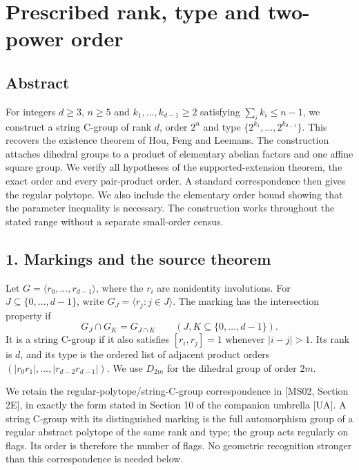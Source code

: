 \documentclass[
  11pt,
  a4paper,
]{article}
\author{}
\date{}
\begin{document}
\section{Prescribed rank, type and two-power
order}\label{prescribed-rank-type-and-two-power-order}

\subsection{Abstract}\label{abstract}

For integers \(d\ge3\), \(n\ge5\) and \(k_1,\ldots,k_{d-1}\ge2\)
satisfying \(\sum_i k_i\le n-1\), we construct a string C-group of rank
\(d\), order \(2^n\) and type \(\{2^{k_1},\ldots,2^{k_{d-1}}\}\). This
recovers the existence theorem of Hou, Feng and Leemans. The
construction attaches dihedral groups to a product of elementary abelian
factors and one affine square group. We verify all hypotheses of the
supported-extension theorem, the exact order and every pair-product
order. A standard correspondence then gives the regular polytope. We
also include the elementary order bound showing that the parameter
inequality is necessary. The construction works throughout the stated
range without a separate small-order census.

\subsection{1. Markings and the source
theorem}\label{markings-and-the-source-theorem}

Let \(G=\langle r_0,\ldots,r_{d-1}\rangle\), where the \(r_i\) are
nonidentity involutions. For \(J\subseteq\{0,\ldots,d-1\}\), write
\(G_J=\langle r_j:j\in J\rangle\). The marking has the intersection
property if \[
G_J\cap G_K=G_{J\cap K}\qquad(J,K\subseteq\{0,\ldots,d-1\}).
\] It is a string C-group if it also satisfies \([r_i,r_j]=1\) whenever
\(|i-j|>1\). Its rank is \(d\), and its type is the ordered list of
adjacent product orders \((|r_0r_1|,\ldots,|r_{d-2}r_{d-1}|)\). We use
\(D_{2m}\) for the dihedral group of order \(2m\).

We retain the regular-polytope/string-C-group correspondence in {[}MS02,
Section 2E{]}, in exactly the form stated in Section 10 of the companion
umbrella {[}UA{]}. A string C-group with its distinguished marking is
the full automorphism group of a regular abstract polytope of the same
rank and type; the group acts regularly on flags. Its order is therefore
the number of flags. No geometric recognition stronger than this
correspondence is needed below.
\end{document}
